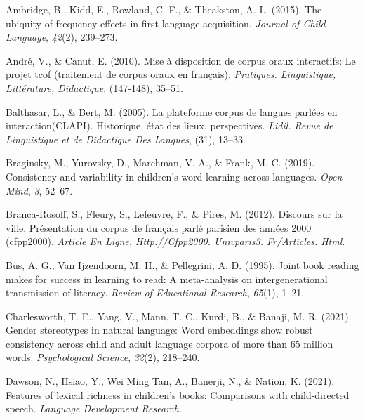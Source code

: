 \documentclass[10pt, letterpaper]{article}
\begin{document}
\setlength{\parindent}{-0.1in} 
\setlength{\leftskip}{0.125in}

\noindent

\hypertarget{refs}{}
\leavevmode\hypertarget{ref-ambridge2015ubiquity}{}%
Ambridge, B., Kidd, E., Rowland, C. F., \& Theakston, A. L. (2015). The
ubiquity of frequency effects in first language acquisition.
\emph{Journal of Child Language}, \emph{42}(2), 239--273.

\leavevmode\hypertarget{ref-andre2010mise}{}%
André, V., \& Canut, E. (2010). Mise à disposition de corpus oraux
interactifs: Le projet tcof (traitement de corpus oraux en français).
\emph{Pratiques. Linguistique, Littérature, Didactique}, (147-148),
35--51.

\leavevmode\hypertarget{ref-balthasar2005plateforme}{}%
Balthasar, L., \& Bert, M. (2005). La plateforme corpus de langues
parlées en interaction(CLAPI). Historique, état des lieux, perspectives.
\emph{Lidil. Revue de Linguistique et de Didactique Des Langues}, (31),
13--33.

\leavevmode\hypertarget{ref-braginsky2019consistency}{}%
Braginsky, M., Yurovsky, D., Marchman, V. A., \& Frank, M. C. (2019).
Consistency and variability in children's word learning across
languages. \emph{Open Mind}, \emph{3}, 52--67.

\leavevmode\hypertarget{ref-branca2012discours}{}%
Branca-Rosoff, S., Fleury, S., Lefeuvre, F., \& Pires, M. (2012).
Discours sur la ville. Présentation du corpus de français parlé parisien
des années 2000 (cfpp2000). \emph{Article En Ligne, Http://Cfpp2000.
Univparis3. Fr/Articles. Html}.

\leavevmode\hypertarget{ref-bus1995joint}{}%
Bus, A. G., Van Ijzendoorn, M. H., \& Pellegrini, A. D. (1995). Joint
book reading makes for success in learning to read: A meta-analysis on
intergenerational transmission of literacy. \emph{Review of Educational
Research}, \emph{65}(1), 1--21.

\leavevmode\hypertarget{ref-charlesworth2021gender}{}%
Charlesworth, T. E., Yang, V., Mann, T. C., Kurdi, B., \& Banaji, M. R.
(2021). Gender stereotypes in natural language: Word embeddings show
robust consistency across child and adult language corpora of more than
65 million words. \emph{Psychological Science}, \emph{32}(2), 218--240.

\leavevmode\hypertarget{ref-dawson2021features}{}%
Dawson, N., Hsiao, Y., Wei Ming Tan, A., Banerji, N., \& Nation, K.
(2021). Features of lexical richness in children's books: Comparisons
with child-directed speech. \emph{Language Development Research}.
\end{document}
